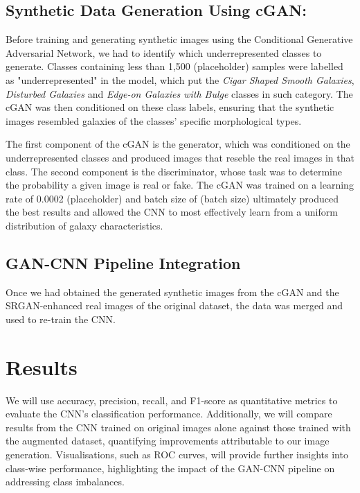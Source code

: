 \documentclass[10pt,twocolumn,letterpaper]{article}
\begin{document}
\subsection{Synthetic Data Generation Using cGAN:} 
Before training and generating synthetic images using the Conditional Generative Adversarial Network, we had to identify which underrepresented classes to generate.
Classes containing less than 1,500 (placeholder) samples were labelled as "underrepresented" in the model, which put the \textit{Cigar Shaped Smooth Galaxies}, \textit{Disturbed Galaxies} and \textit{Edge-on Galaxies with Bulge} classes in such category.
The cGAN was then conditioned on these class labels, ensuring that the synthetic images resembled galaxies of the classes' specific morphological types. 

The first component of the cGAN is the generator, which was conditioned on the underrepresented classes and produced images that reseble the real images in that class.
The second component is the discriminator, whose task was to determine the probability a given image is real or fake.
The cGAN was trained on a learning rate of 0.0002 (placeholder) and batch size of (batch size) ultimately produced the best results and allowed the CNN to most effectively learn from a uniform distribution of galaxy characteristics.


\subsection{GAN-CNN Pipeline Integration} 
Once we had obtained the generated synthetic images from the cGAN and the SRGAN-enhanced real images of the original dataset, the data was merged and used to re-train the CNN.



\section{Results}


We will use accuracy, precision, recall, and F1-score as quantitative metrics to evaluate the CNN's classification performance. 
Additionally, we will compare results from the CNN trained on original images alone against those trained with the augmented dataset, quantifying improvements attributable to our image generation. 
Visualisations, such as ROC curves, will provide further insights into class-wise performance, highlighting the impact of the GAN-CNN pipeline on addressing class imbalances.
\end{document}
